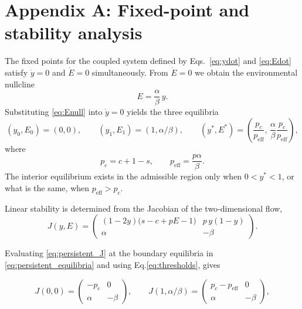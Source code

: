 \documentclass[11pt]{article}
\begin{document}
\section*{Appendix A: Fixed-point and stability analysis}

The fixed points for the coupled system defined by Eqs.~\eqref{eq:ydot} and \eqref{eq:Edot} satisfy $\dot y=0$ and $\dot E=0$ simultaneously. From $\dot E=0$ we obtain the environmental nullcline
\begin{equation}
E=\frac{\alpha}{\beta}\,y.
\label{eq:Enull}
\end{equation}
Substituting \eqref{eq:Enull} into $\dot y=0$ yields the three equilibria
\begin{equation}
(y_0,E_0)=(0,0), \qquad (y_1,E_1)=(1,\alpha/\beta), \qquad 
(y^*,E^*)=\left(\frac{p_c}{p_{\mathrm{eff}}},\,\frac{\alpha}{\beta}\frac{p_c}{p_{\mathrm{eff}}}\right),
\label{eq:persistent_equilibria}
\end{equation}
where
\begin{equation}
p_c=c+1-s, \qquad p_{\mathrm{eff}}=\frac{p\alpha}{\beta}.
\label{eq:thresholds}
\end{equation}
The interior equilibrium exists in the admissible region only when $0<y^*<1$, or what is the same, when $p_{\mathrm{eff}}>p_c$.

Linear stability is determined from the Jacobian of the two‑dimensional flow,
\begin{equation}
J(y,E) =
\begin{pmatrix}
(1-2y)\bigl(s - c + pE - 1\bigr) & p\,y(1-y) \\
\alpha & -\beta
\end{pmatrix}.
\label{eq:persistent_J}
\end{equation}

Evaluating \eqref{eq:persistent_J} at the boundary equilibria in \eqref{eq:persistent_equilibria} and using Eq.\eqref{eq:thresholds}, gives

\begin{equation}
J(0,0)=
\begin{pmatrix}
-p_c & 0 \\
\alpha & -\beta
\end{pmatrix},
\qquad
J(1,\alpha/\beta)=
\begin{pmatrix}
p_c - p_{\mathrm{eff}} & 0 \\
\alpha & -\beta
\end{pmatrix},
\label{eq:persistent_J_boundaries_simp}
\end{equation}
\end{document}
